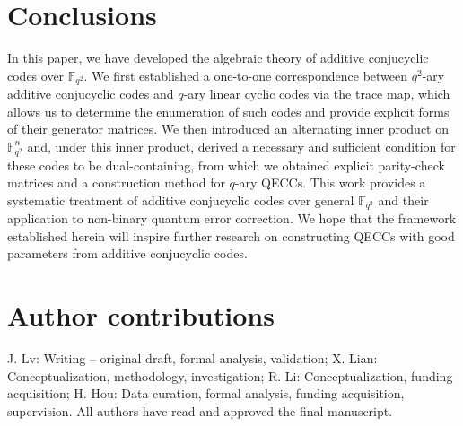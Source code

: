 \documentclass{aims}
\numberwithin{equation}{section}
\theoremstyle{definition}
\newcommand{\F}{\mathbb{F}}
\begin{document}
\section{Conclusions}\label{sec:conclusion}
In this paper, we have developed the algebraic theory of additive conjucyclic codes over $\F_{q^2}$. We first established a one-to-one correspondence between $q^2$-ary additive conjucyclic codes and $q$-ary linear cyclic codes via the trace map, which allows us to determine the enumeration of such codes and provide explicit forms of their generator matrices. We then introduced an alternating inner product on $\F_{q^2}^n$ and, under this inner product, derived a necessary and sufficient condition for these codes to be dual-containing, from which we obtained explicit parity-check matrices and a construction method for $q$-ary QECCs. This work provides a systematic treatment of additive conjucyclic codes over general $\F_{q^2}$ and their application to non-binary quantum error correction. We hope that the framework established herein will inspire further research on constructing QECCs with good parameters from additive conjucyclic codes.



\section*{Author contributions}
J. Lv: Writing – original draft, formal analysis, validation; X. Lian: Conceptualization, methodology, investigation; R. Li: Conceptualization, funding acquisition; H. Hou: Data curation, formal analysis, funding acquisition, supervision. All authors have read and approved the final manuscript.




\end{document}

